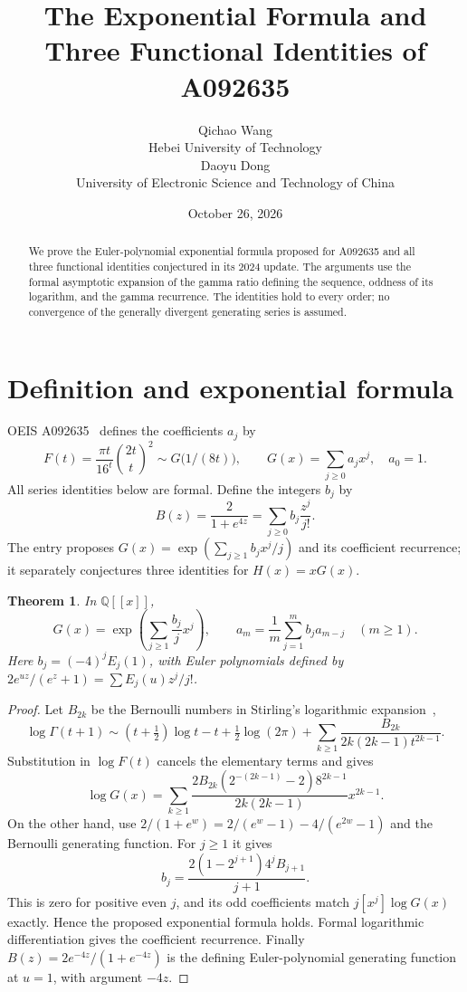\documentclass[10pt]{article}
\title{The Exponential Formula and Three Functional Identities of A092635}
\author{Qichao Wang\\{\small Hebei University of Technology}\\[.3em]Daoyu Dong\\{\small University of Electronic Science and Technology of China}}
\date{October 26, 2026}
\newtheorem{theorem}{Theorem}
\begin{document}
\maketitle
\begin{abstract}
We prove the Euler-polynomial exponential formula proposed for
A092635 and all three functional identities conjectured in its
2024 update. The arguments use the formal asymptotic expansion
of the gamma ratio defining the sequence, oddness of its logarithm,
and the gamma recurrence. The identities hold to every order;
no convergence of the generally divergent generating series is
assumed.
\end{abstract}
\section{Definition and exponential formula}
OEIS A092635~\cite{oeis} defines the coefficients $a_j$ by
\[
 F(t)=\frac{\pi t}{16^t}\binom{2t}{t}^{\!2}
 \sim G\bigl(1/(8t)\bigr),\qquad
 G(x)=\sum_{j\ge0}a_jx^j,\quad a_0=1.
\]
All series identities below are formal. Define the integers $b_j$ by
\[
 B(z)=\frac2{1+e^{4z}}=\sum_{j\ge0}b_j\frac{z^j}{j!}.
\]
The entry proposes $G(x)=\exp(\sum_{j\ge1}b_jx^j/j)$ and its
coefficient recurrence; it separately conjectures three identities
for $H(x)=xG(x)$.
\begin{theorem}
In $\mathbb Q[[x]]$,
\[
 G(x)=\exp\left(\sum_{j\ge1}\frac{b_j}{j}x^j\right),
 \qquad
 a_m=\frac1m\sum_{j=1}^m b_j a_{m-j}\quad(m\ge1).
\]
Here $b_j=(-4)^jE_j(1)$, with Euler polynomials defined by
$2e^{uz}/(e^z+1)=\sum E_j(u)z^j/j!$.
\end{theorem}
\begin{proof}
Let $B_{2k}$ be the Bernoulli numbers in Stirling's logarithmic
expansion~\cite{dlmf},
\[
 \log\Gamma(t+1)\sim
 (t+\tfrac12)\log t-t+\tfrac12\log(2\pi)
 +\sum_{k\ge1}\frac{B_{2k}}{2k(2k-1)t^{2k-1}}.
\]
Substitution in $\log F(t)$ cancels the elementary terms and gives
\[
 \log G(x)=\sum_{k\ge1}
 \frac{2B_{2k}(2^{-(2k-1)}-2)8^{2k-1}}
 {2k(2k-1)}x^{2k-1}.
\]
On the other hand, use
$2/(1+e^w)=2/(e^w-1)-4/(e^{2w}-1)$ and the Bernoulli
generating function. For $j\ge1$ it gives
\[
 b_j=\frac{2(1-2^{j+1})4^jB_{j+1}}{j+1}.
\]
This is zero for positive even $j$, and its odd coefficients
match $j[x^j]\log G(x)$ exactly. Hence the proposed exponential
formula holds. Formal logarithmic differentiation gives the
coefficient recurrence. Finally
$B(z)=2e^{-4z}/(1+e^{-4z})$ is the defining Euler-polynomial
generating function at $u=1$, with argument $-4z$.
\end{proof}
\end{document}
